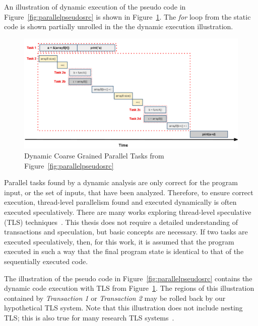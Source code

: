 \documentclass[defaultstyle,11pt]{thesis}
\begin{document}
An illustration of dynamic execution of the pseudo code in
Figure~\ref{fig:parallelpseudosrc} is shown in
Figure~\ref{fig:parallelpseudocoarsedyn}.  The \textit{for} loop from
the static code is shown partially unrolled in the the dynamic
execution illustration.

\begin{figure}
\begin{center}
\includegraphics[width=5in]{images/ParallelTasksCoarseDyn}
\end{center}
\caption{Dynamic Coarse Grained Parallel Tasks from Figure~\ref{fig:parallelpseudosrc}}
\label{fig:parallelpseudocoarsedyn}
\end{figure}

Parallel tasks found by a dynamic analysis are only correct for the
program input, or the set of inputs, that have been analyzed.
Therefore, to ensure correct execution, thread-level parallelism found
and executed dynamically is often executed speculatively. There are
many works exploring thread-level speculative (TLS)
techniques~\cite{steffan:00:isca,vachharajani:07:pact,warg:2001:pact,wu:2008:cdp,chen:cc:2004,dou:2007:trans,wang:2009:dps,Rangan:2004kx,Ottoni:2005uq}.
This thesis does not require a detailed understanding of transactions
and speculation, but basic concepts are necessary.  If two tasks are
executed speculatively, then, for this work, it is assumed that the
program executed in such a way that the final program state is
identical to that of the sequentially executed code.

The illustration of the pseudo code in
Figure~\ref{fig:parallelpseudosrc} contains the dynamic code execution
with TLS from Figure~\ref{fig:parallelpseudocoarsedyn}.  The regions
of this illustration contained by \textit{Transaction 1} or
\textit{Transaction 2} may be rolled back by our hypothetical TLS
system.  Note that this illustration does not include nesting TLS;
this is also true for many research TLS
systems~\cite{prabhu:2005:ppopp}.
\end{document}
